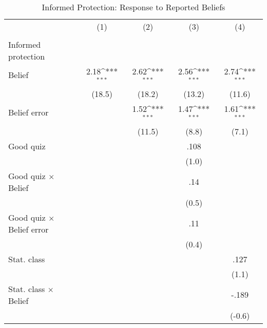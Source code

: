 \begin{table}[htbp]\centering
\def\sym#1{\ifmmode^{#1}\else\(^{#1}\)\fi}
\caption{Informed Protection: Response to Reported Beliefs}
\begin{tabular}{l*{4}{c}}
\hline\hline
                &\multicolumn{1}{c}{(1)}&\multicolumn{1}{c}{(2)}&\multicolumn{1}{c}{(3)}&\multicolumn{1}{c}{(4)}\\
                &\multicolumn{1}{c}{}&\multicolumn{1}{c}{}&\multicolumn{1}{c}{}&\multicolumn{1}{c}{}\\
\hline
Informed protection&                  &                  &                  &                  \\
Belief          &     2.18\sym{***}&     2.62\sym{***}&     2.56\sym{***}&     2.74\sym{***}\\
                &   (18.5)         &   (18.2)         &   (13.2)         &   (11.6)         \\
Belief error    &                  &     1.52\sym{***}&     1.47\sym{***}&     1.61\sym{***}\\
                &                  &   (11.5)         &    (8.8)         &    (7.1)         \\
Good quiz       &                  &                  &     .108         &                  \\
                &                  &                  &    (1.0)         &                  \\
Good quiz $\times$ Belief&                  &                  &      .14         &                  \\
                &                  &                  &    (0.5)         &                  \\
Good quiz $\times$ Belief error&                  &                  &      .11         &                  \\
                &                  &                  &    (0.4)         &                  \\
Stat. class     &                  &                  &                  &     .127         \\
                &                  &                  &                  &    (1.1)         \\
Stat. class $\times$ Belief&                  &                  &                  &    -.189         \\
                &                  &                  &                  &   (-0.6)         \\

\end{tabular}
\end{table}
